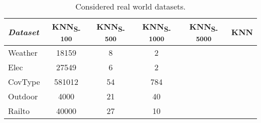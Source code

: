 \documentclass[conference]{IEEEtran}
\begin{document}
\begin{table}
\def\arraystretch{0.9}
\footnotesize
\centering
\caption{Considered real world datasets.}
\label{tab:driftInRealDatasets}
\begin{tabular}{l|ccccc}
\textit{Dataset} & KNN\textsubscript{S-100}&KNN\textsubscript{S-500}&KNN\textsubscript{S-1000}&KNN\textsubscript{S-5000}&KNN\\\hline
\rule{0pt}{8pt}
Weather & 18159 & 8 & 2\\
Elec & 27549 & 6 & 2\\
CovType & 581012 & 54 & 784\\
Outdoor & 4000 & 21 & 40\\
Railto & 40000 & 27 & 10\\
\end{tabular}
\label{tab:datasets}
\end{table}
\end{document}
